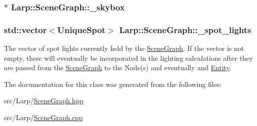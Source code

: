 \subsubsection[{\texorpdfstring{\+\_\+skybox}{_skybox}}]{$\ast$ Larp\+::\+Scene\+Graph\+::\+\_\+skybox\hspace{0.3cm}{\ttfamily [private]}}\hypertarget{classLarp_1_1SceneGraph_a5821f205cc6238c6855a08e1016ac768}{}\label{classLarp_1_1SceneGraph_a5821f205cc6238c6855a08e1016ac768}
\subsubsection[{\texorpdfstring{\+\_\+spot\+\_\+lights}{_spot_lights}}]{\setlength{\rightskip}{0pt plus 5cm}std\+::vector$<${\bf Unique\+Spot}$>$ Larp\+::\+Scene\+Graph\+::\+\_\+spot\+\_\+lights\hspace{0.3cm}{\ttfamily [private]}}\hypertarget{classLarp_1_1SceneGraph_a7abcb3d4cfaa7b4d92d30cbbeeeb275f}{}\label{classLarp_1_1SceneGraph_a7abcb3d4cfaa7b4d92d30cbbeeeb275f}
The vector of spot lights currently held by the \hyperlink{classLarp_1_1SceneGraph}{Scene\+Graph}. If the vector is not empty, these will eventually be incorporated in the lighting calculations after they are passed from the \hyperlink{classLarp_1_1SceneGraph}{Scene\+Graph} to the Node(s) and eventually and \hyperlink{classLarp_1_1Entity}{Entity}. 

The documentation for this class was generated from the following files\+:\begin{DoxyCompactItemize}
\item 
src/\+Larp/\hyperlink{SceneGraph_8hpp}{Scene\+Graph.\+hpp}\item 
src/\+Larp/\hyperlink{SceneGraph_8cpp}{Scene\+Graph.\+cpp}\end{DoxyCompactItemize}
